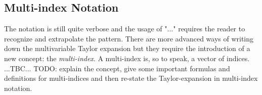 









% 

\subsection{Multi-index Notation}
The notation is still quite verbose and the usage of "$\ldots$" requires the reader to recognize and extrapolate the pattern. There are more advanced ways of writing down the multivariable Taylor expansion but they require the introduction of a new concept: the \emph{multi-index}. A multi-index is, so to speak, a vector of indices. ...TBC... TODO: explain the concept, give some important formulas and definitions for multi-indices and then re-state the Taylor-expansion in multi-index notation.


